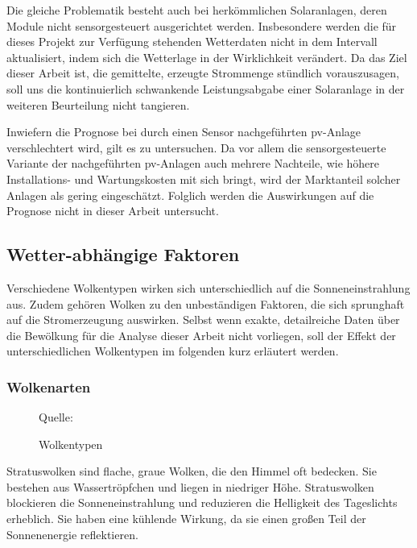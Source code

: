 \documentclass[12pt, a4paper]{article}
\begin{document}
Die gleiche Problematik besteht auch bei herkömmlichen Solaranlagen, deren Module nicht sensorgesteuert ausgerichtet werden. Insbesondere werden die für dieses Projekt zur Verfügung stehenden Wetterdaten  nicht in dem Intervall aktualisiert, indem sich die Wetterlage in der Wirklichkeit verändert. Da das Ziel dieser Arbeit ist, die gemittelte, erzeugte Strommenge stündlich vorauszusagen, soll uns die kontinuierlich schwankende Leistungsabgabe einer Solaranlage in der weiteren Beurteilung nicht tangieren. 

Inwiefern die Prognose bei durch einen Sensor nachgeführten \ac{pv}-Anlage verschlechtert wird, gilt es zu untersuchen. Da vor allem die sensorgesteuerte Variante der nachgeführten \ac{pv}-Anlagen auch mehrere Nachteile, wie höhere Installations- und Wartungskosten mit sich bringt, wird der Marktanteil solcher Anlagen als gering eingeschätzt. Folglich werden die Auswirkungen auf die Prognose nicht in dieser Arbeit untersucht.

\subsection{Wetter-abhängige Faktoren}

Verschiedene Wolkentypen wirken sich unterschiedlich auf die Sonneneinstrahlung aus. Zudem gehören Wolken zu den unbeständigen Faktoren, die sich sprunghaft auf die Stromerzeugung auswirken. Selbst wenn exakte, detailreiche Daten über die Bewölkung für die Analyse dieser Arbeit nicht vorliegen, soll der Effekt der unterschiedlichen Wolkentypen im folgenden kurz erläutert werden.

\subsubsection{Wolkenarten}
\label{subsubsec:clouds}

\begin{figure}
\centering
\def\svgwidth{425pt}

\captionsetup{justification=raggedleft,singlelinecheck=false,skip=0pt}\caption*{\scriptsize{Quelle: \cite{pic:wikipedia}}}
\captionsetup{justification=centering,singlelinecheck=false,skip=25pt}
\caption{Wolkentypen}
\label{wolkentypen}
\end{figure}


Stratuswolken sind flache, graue Wolken, die den Himmel oft bedecken. Sie bestehen aus Wassertröpfchen und liegen in niedriger Höhe. Stratuswolken blockieren die Sonneneinstrahlung und reduzieren die Helligkeit des Tageslichts erheblich. Sie haben eine kühlende Wirkung, da sie einen großen Teil der Sonnenenergie reflektieren.
\end{document}
